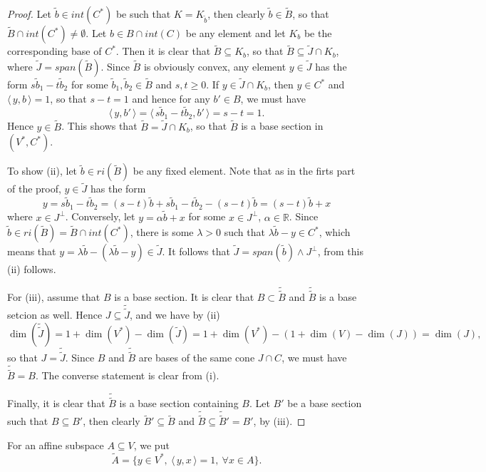 \documentclass[12pt]{article}
\theoremstyle{definition}
\theoremstyle{remark}
\def\<{\langle\,}
\def\>{\,\rangle}
\begin{document}
\begin{proof} Let $\tilde b\in int(C^*)$ be such that $K=K_{\tilde b}$, then clearly
$\tilde b\in \tilde B$, so that $\tilde B\cap int(C^*)\ne \emptyset$. 
Let $b\in B\cap int(C)$ be any element and let $K_b$ be the
corresponding base of $C^*$.  Then it is clear that 
$\tilde B\subseteq K_b$, so that $\tilde B\subseteq \tilde J\cap K_b$, where $\tilde
J=span(\tilde B)$. Since $\tilde B$ is  obviously convex, any element  $y\in \tilde J$ has
the form $s\tilde b_1-t\tilde b_2$ for some $\tilde b_1,\tilde b_2\in \tilde B$ and
$s,t\ge 0$. If $y\in \tilde J\cap K_b$, then $y\in C^*$ and $\<y,b\>=1$, so that $s-t=1$
and hence for any $b'\in B$, we must have
\[
\<y,b'\>=\<s\tilde b_1-t\tilde b_2,b'\>=s-t=1.
\]
Hence $y\in \tilde B$. This shows that $\tilde B=\tilde J\cap K_b$, so that $\tilde B$ is
a base section in $(V^*,C^*)$.


To show (ii), let $\tilde b\in ri(\tilde B)$ be any fixed element. Note that as in the firts part of
the proof,   $y\in \tilde J$ has the form
\[
y=s\tilde b_1-t\tilde b_2=(s-t)\tilde b+s\tilde b_1-t\tilde b_2-(s-t)\tilde b=(s-t)\tilde
b+x
\]
where $x\in J^\perp$. Conversely, let $y=\alpha\tilde b+x$ for some  $x\in J^\perp$, $\alpha\in \mathbb R$. Since $\tilde
b\in ri(\tilde B)=\tilde B\cap int(C^*)$, there is some $\lambda>0$ such that
$ \lambda\tilde b-y\in C^*$, which means that $y=\lambda\tilde b-(\lambda\tilde b-y)\in
\tilde J$. It follows that $\tilde J=span(\tilde b)\wedge J^\perp$, from this (ii)
follows.

For (iii), assume that $B$ is a base section. It is clear that $B\subset
\tilde{\tilde{B}}$ and $\tilde{\tilde B}$ is a base setcion as well. Hence  $J\subseteq
\tilde{\tilde J}$, and we have by (ii)
\[
\dim(\tilde{\tilde J})=1+\dim(V^*)-\dim(\tilde J)=1+\dim(V^*)-(1+\dim(V)-\dim(J))=\dim(J),
\]
so that $J=\tilde{\tilde J}$. Since $B$ and $\tilde {\tilde B}$ are bases of the same cone
$J\cap C$, we must have $\tilde {\tilde B}=B$. The converse statement is clear from (i).

Finally, it is clear that $\tilde{\tilde B}$ is a base section containing $B$. Let $B'$ be a
base section such that $B\subseteq B'$, then clearly $\tilde B'\subseteq \tilde B$ and
$\tilde{\tilde B}\subseteq \tilde {\tilde B}'=B'$, by (iii).



\end{proof}

For an affine subspace $A\subseteq V$, we put
\[
\tilde A=\{y\in V^*,\ \<y,x\>=1,\ \forall x\in A\}.
\]
\end{document}
